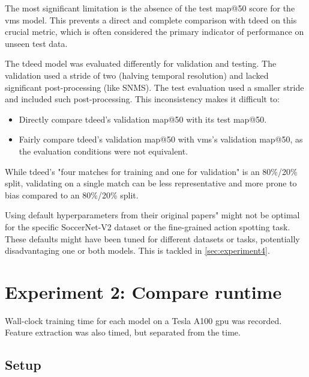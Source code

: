 The most significant limitation is the absence of the test \acrshort{map}@50 score for the \acrshort{vms} model. This prevents a direct and complete comparison with \acrshort{tdeed} on this crucial metric, which is often considered the primary indicator of performance on unseen test data.

The \acrshort{tdeed} model was evaluated differently for validation and testing. The validation used a stride of two (halving temporal resolution) and lacked significant post-processing (like SNMS). The test evaluation used a smaller stride and included such post-processing. This inconsistency makes it difficult to:

\begin{itemize}
    \item Directly compare \acrshort{tdeed}'s validation \acrshort{map}@50 with its test \acrshort{map}@50.
    \item Fairly compare \acrshort{tdeed}'s validation \acrshort{map}@50 with \acrshort{vms}'s validation \acrshort{map}@50, as the evaluation conditions were not equivalent.
\end{itemize}

While \acrshort{tdeed}'s "four matches for training and one for validation" is an 80\%/20\% split, validating on a single match can be less representative and more prone to bias compared to an 80\%/20\% split.

Using default hyperparameters from their original papers" might not be optimal for the specific SoccerNet-V2 dataset or the fine-grained action spotting task. These defaults might have been tuned for different datasets or tasks, potentially disadvantaging one or both models. This is tackled in \autoref{sec:experiment4}.



\section{Experiment 2: Compare runtime}
\label{sec:experiment2}

Wall-clock training time for each model on a Tesla A100 \acrshort{gpu} was recorded. Feature extraction was also timed, but separated from the time. 



\subsection{Setup}
\label{ssec:ex2_setup}

